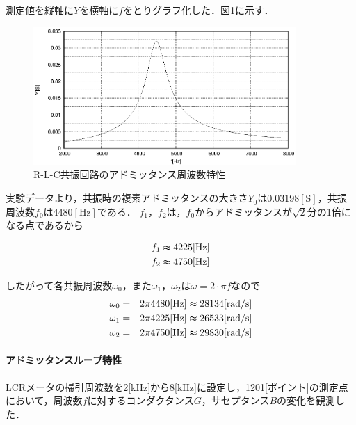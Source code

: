 \documentclass[dvipdfmx,titlepage,a4j]{jsarticle}  %
\numberwithin{equation}{section}
\begin{document}
測定値を縦軸に$Y$を横軸に$f$をとりグラフ化した．図\ref{fig:A_YTheta.eps}に示す．
\begin{figure}[H]
  \centering
  \includegraphics[width=10cm]{../gnuplot/A_YTheta.eps}
  \caption{R-L-C共振回路のアドミッタンス周波数特性}
  \label{fig:A_YTheta.eps}
\end{figure}

実験データより，共振時の複素アドミッタンスの大きさ$Y_0$は$0.03198 \mathrm{[S]}$，共振周波数$f_0$は$4480 \mathrm{[Hz]}$である．
$f_1$，$f_2$は，$f_0$からアドミッタンスが$\sqrt{2}$分の1倍になる点であるから

\begin{eqnarray}
  f_1 \thickapprox 4225 \mathrm{[Hz]}\\
  f_2 \thickapprox 4750 \mathrm{[Hz]}
\end{eqnarray}

したがって各共振周波数$\omega_0$，また$\omega_1$，$\omega_2$は$\omega = 2 \cdot \pi f$なので
\begin{eqnarray}
  \omega_0 &=& 2 \pi 4480 \mathrm{[Hz]} \thickapprox 28134 \mathrm{[rad/s]}\\
  \omega_1 &=& 2 \pi 4225 \mathrm{[Hz]} \thickapprox 26533 \mathrm{[rad/s]}\\
  \omega_2 &=& 2 \pi 4750 \mathrm{[Hz]} \thickapprox 29830 \mathrm{[rad/s]}
\end{eqnarray}

\paragraph{アドミッタンスループ特性}
LCRメータの掃引周波数を2[kHz]から8[kHz]に設定し，1201[ポイント]の測定点において，周波数$f$に対するコンダクタンス$G$，サセプタンス$B$の変化を観測した．\
\end{document}
